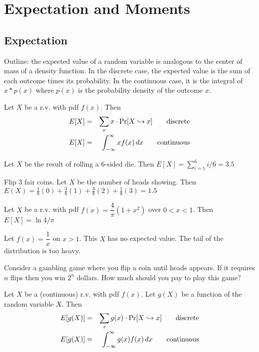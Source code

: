 \documentclass[../main.tex]{subfiles}
\begin{document}
\chapter{Expectation and Moments}
\section{Expectation}
Outline: the expected value of a random variable is analogous to the center of mass of a density function. In the discrete case, the expected value is the sum of each outcome times its probability. In the continuous case, it is the integral of $x*p(x)$
where $p(x)$ is the probability density of the outcome $x$.

\begin{definition}
Let $X$ be a r.v. with pdf $f(x)$. Then 
\begin{eqnarray*}
    E[X] &=& \sum_x x\cdot\mathrm{Pr}[X\hookrightarrow x] \qquad \mbox{discrete} \\
    E[X] &=& \int_{-\infty}^{\infty} x f(x) \,dx \qquad \mbox{continuous}
\end{eqnarray*}
\end{definition}
\begin{example}
Let $X$ be the result of rolling a 6-sided die. Then $E[X] = \sum_{i=1}^6 i/6 = 3.5$
\end{example}
\begin{example}
Flip 3 fair coins. Let $X$ be the number of heads showing. Then $E(X) = \frac18(0)+
\frac38(1) + \frac38(2) + \frac18(3) = 1.5$
\end{example}
\begin{example}
Let $X$ be a r.v. with pdf $f(x) = \dfrac{4}{\pi}(1+x^2)$ over $0<x<1$. Then $E[X] = \ln 4/\pi$
\end{example}
\begin{example}
Let $f(x) = \dfrac{1}{x}$ on $x>1$. This $X$ has no expected value. The tail of the distribution is too heavy.
\end{example}
\begin{remark}
Consider a gambling game where you flip a coin until heads appears. If it requires $n$ flips then you win $2^n$ dollars. How much should you pay to play this game?
\end{remark}
\begin{definition}
Let $X$ be a (continuous) r.v. with pdf $f(x)$. Let $g(X)$ be a function of the random variable $X$. Then
\begin{eqnarray*}
    E[g(X)] &=& \sum_x g(x)\cdot\mathrm{Pr}[X\hookrightarrow x] \qquad \mbox{discrete} \\
    E[g(X)] &=& \int_{-\infty}^{\infty} g(x) f(x) \,dx \qquad \mbox{continuous}
\end{eqnarray*}
\end{definition}
\end{document}
